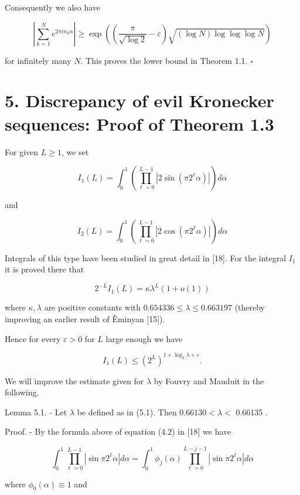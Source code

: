 \documentclass[10pt]{article}
\begin{document}
Consequently we also have

$$
\left|\sum_{k=1}^{N} e^{2 \pi i n_{k} \alpha}\right| \geqslant \exp \left(\left(\frac{\pi}{\sqrt{\log 2}}-\varepsilon\right) \sqrt{(\log N) \log \log \log N}\right)
$$

for infinitely many $N$. This proves the lower bound in Theorem 1.1. \(\square\)

\section*{5. Discrepancy of evil Kronecker sequences: Proof of Theorem 1.3}
For given $L \geqslant 1$, we set

$$
I_{1}(L)=\int_{0}^{1}\left(\prod_{\ell=0}^{L-1}\left|2 \sin \left(\pi 2^{\ell} \alpha\right)\right|\right) d \alpha
$$

and

$$
I_{2}(L)=\int_{0}^{1}\left(\prod_{\ell=0}^{L-1}\left|2 \cos \left(\pi 2^{\ell} \alpha\right)\right|\right) d \alpha
$$

Integrals of this type have been studied in great detail in [18]. For the integral $I_{1}$ it is proved there that


\begin{equation*}
2^{-L} I_{1}(L)=\kappa \lambda^{L}(1+o(1)) \tag{5.1}
\end{equation*}


where $\kappa, \lambda$ are positive constants with $0.654336 \leqslant \lambda \leqslant 0.663197$ (thereby improving an earlier result of Èminyan [15]).

Hence for every $\varepsilon>0$ for $L$ large enough we have


\begin{equation*}
I_{1}(L) \leqslant\left(2^{L}\right)^{1+\log _{2} \lambda+\varepsilon} . \tag{5.2}
\end{equation*}


We will improve the estimate given for $\lambda$ by Fouvry and Mauduit in the following.

Lemma 5.1. - Let $\lambda$ be defined as in (5.1). Then $0.66130<\lambda<$ 0.66135 .

Proof. - By the formula above of equation (4.2) in [18] we have

$$
\int_{0}^{1} \prod_{\ell=0}^{L-1}\left|\sin \pi 2^{\ell} \alpha\right| d \alpha=\int_{0}^{1} \phi_{j}(\alpha) \prod_{\ell=0}^{L-j-1}\left|\sin \pi 2^{\ell} \alpha\right| d \alpha
$$

where $\phi_{0}(\alpha) \equiv 1$ and
\end{document}
